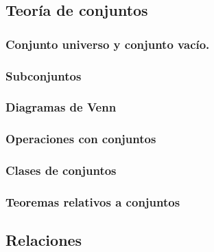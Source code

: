 \documentclass{article}
\begin{document}
\clearpage
\subsection{Teoría de conjuntos}
 

\subsubsection{Conjunto universo y conjunto vacío.}


\subsubsection{Subconjuntos}


\subsubsection{Diagramas de Venn}
\clearpage

\subsubsection{Operaciones con conjuntos}


\subsubsection{Clases de conjuntos}


\subsubsection{Teoremas relativos a conjuntos}



\clearpage
\subsection{Relaciones}
 
\end{document}
